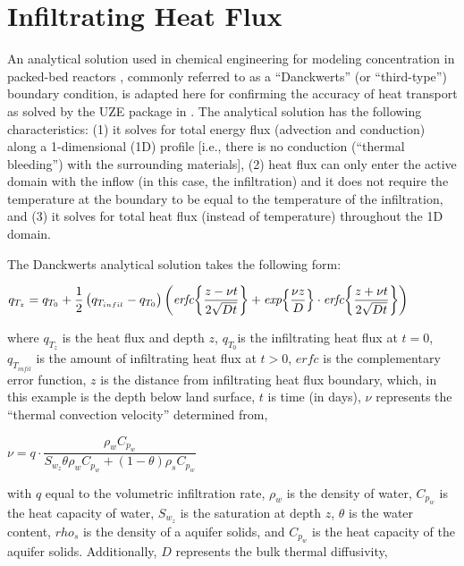 \section{Infiltrating Heat Flux}

An analytical solution used in chemical engineering for modeling concentration in packed-bed reactors , commonly referred to as a ``Danckwerts'' (or ``third-type'') boundary condition, is adapted here for confirming the accuracy of heat transport as solved by the UZE package in \mf.  The analytical solution has the following characteristics: (1) it solves for total energy flux (advection and conduction) along a 1-dimensional (1D) profile [i.e., there is no conduction (``thermal bleeding'') with the surrounding materials], (2) heat flux can only enter the active domain with the inflow (in this case, the infiltration) and it does not require the temperature at the boundary to be equal to the temperature of the infiltration, and (3) it solves for total heat flux (instead of temperature) throughout the 1D domain.

The Danckwerts analytical solution takes the following form:

\bigskip
$q_{T_z} = q_{T_0} + \dfrac{1}{2} \left( q_{T_{infil}} - q_{T_0} \right) \left( \textit{erfc} \biggl\{ \dfrac{z-\nu t}{2 \sqrt{Dt}} \biggr\}  + \textit{exp} \Bigl\{ \dfrac{\nu z}{D}\Bigr\} \cdot \textit{erfc} \biggl\{ \dfrac{z+\nu t}{2 \sqrt{Dt}} \biggr\} \right)$
\bigskip

\noindent where $q_{T_z}$ is the heat flux and depth $z$, $q_{T_0}$is the infiltrating heat flux at $t=0$, $q_{T_{infil}}$ is the amount of infiltrating heat flux at $t > 0$, $\textit{erfc}$ is the complementary error function, $z$ is the distance from infiltrating heat flux boundary, which, in this example is the depth below land surface, $t$ is time (in days), $\nu$ represents the ``thermal convection velocity'' determined from,

\bigskip
$\nu=q \cdot \dfrac{\rho_w C_{p_w}}{S_{w_z} \theta \rho_w C_{p_w} + \left( 1-\theta \right) \rho_s C_{p_w}}$
\bigskip

\noindent with $q$ equal to the volumetric infiltration rate, $\rho_w$ is the density of water, $C_{p_w}$ is the heat capacity of water, $S_{w_z}$ is the saturation at depth $z$, $\theta$ is the water content, $rho_s$ is the density of a aquifer solids, and $C_{p_w}$ is the heat capacity of the aquifer solids. Additionally, $D$ represents the bulk thermal diffusivity,

